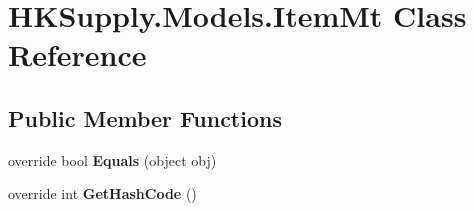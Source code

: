 \hypertarget{class_h_k_supply_1_1_models_1_1_item_mt}{}\section{H\+K\+Supply.\+Models.\+Item\+Mt Class Reference}
\label{class_h_k_supply_1_1_models_1_1_item_mt}
\subsection*{Public Member Functions}
\begin{DoxyCompactItemize}
\item 
\mbox{\label{class_h_k_supply_1_1_models_1_1_item_mt_a36b96f08a2c645d6a28faf9ead3c603e}} 
override bool {\bfseries Equals} (object obj)
\item 
\mbox{\label{class_h_k_supply_1_1_models_1_1_item_mt_aaefe719e9f834a96fc958e573f9fc859}} 
override int {\bfseries Get\+Hash\+Code} ()
\end{DoxyCompactItemize}
